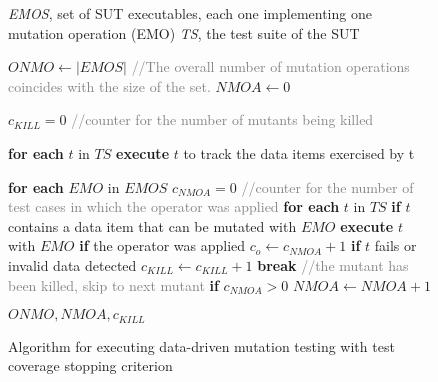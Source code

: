 

\begin{figure}[tb]

\begin{algorithmic}[1]

\scriptsize
\Require \emph{EMOS}, set of SUT executables, each one implementing one mutation operation (EMO)
\Require \emph{TS}, the test suite of the SUT

\State $\mathit{ONMO} \gets |EMOS|$ \textcolor{gray}{//The overall number of mutation operations coincides with the size of the set.} 
\State $\mathit{NMOA} \gets 0$

\State $c_{\mathit{KILL}}=0$ \textcolor{gray}{//counter for the number of mutants being killed} 

\State \textbf{for each} $t$ in $TS$ 
\State \hspace{5 mm} \textbf{execute} $t$ to track the data items exercised by t \label{alg:dataProcess:prel}

\State \textbf{for each} $EMO$ in $EMOS$ \label{alg:dataProcess:repeat}
\State \hspace{5 mm} $c_{\mathit{NMOA}}=0$ \textcolor{gray}{//counter for the number of test cases in which the operator was applied} 
\State \hspace{5 mm} \textbf{for each} $t$ in $TS$ 
\State \hspace{10 mm} \textbf{if} $t$ contains a data item that can be mutated with $EMO$ \label{alg:dataProcess:cover}
\State \hspace{15 mm} \textbf{execute} $t$ with $EMO$ \label{alg:dataProcess:execute}
\State \hspace{15 mm} \textbf{if} the operator was applied
\State \hspace{20 mm} $c_o \gets c_{\mathit{NMOA}}+1$
\State \hspace{15 mm} \textbf{if} $t$ fails or invalid data detected  \label{alg:dataProcess:kill}
\State \hspace{20 mm} $c_{\mathit{KILL}} \gets c_{\mathit{KILL}} +1$
\State \hspace{20 mm} \textbf{break} \textcolor{gray}{//the mutant has been killed, skip to next mutant} \label{alg:dataProcess:stop}
\State \hspace{5 mm} \textbf{if} $c_{\mathit{NMOA}} > 0$
\State \hspace{10 mm} $\mathit{NMOA} \gets \mathit{NMOA} + 1$

\State \Return $\mathit{ONMO},\mathit{NMOA},c_{\mathit{KILL}}$

\end{algorithmic}
\vspace{-3mm}
\caption{Algorithm for executing data-driven mutation testing with test coverage stopping criterion}
\label{alg:dataProcess}
\end{figure}


